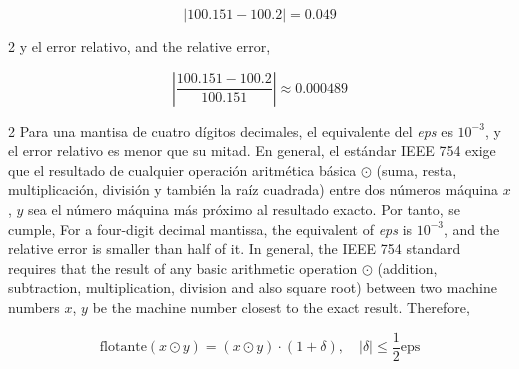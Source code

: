 \begin{equation*}
\vert 100.151-100.2 \vert=0.049
\end{equation*}
\begin{paracol}{2}
y el error relativo,
\switchcolumn
and the relative error,
\end{paracol}
\begin{equation*}
\left\vert\frac{100.151-100.2 }{100.151}\right\vert\approx 0.000489
\end{equation*}
\begin{paracol}{2}
Para una mantisa de cuatro dígitos decimales, el equivalente del \emph{eps} es $10^{-3}$, y el error relativo es menor que su mitad. En general, el estándar IEEE 754 exige que el resultado de cualquier operación aritmética básica $\odot$ (suma, resta, multiplicación, división y también la raíz cuadrada) entre dos números máquina $x$, $y$ sea el número máquina más próximo al resultado exacto. Por tanto, se cumple,
\switchcolumn
For a four-digit decimal mantissa, the equivalent of \emph{eps} is $10^{-3}$, and the relative error is smaller than half of it. In general, the IEEE 754 standard requires that the result of any basic arithmetic operation $\odot$ (addition, subtraction, multiplication, division and also square root) between two machine numbers $x$, $y$ be the machine number closest to the exact result. Therefore,
\end{paracol}
\begin{equation*}
\text{flotante}(x\odot y)=(x\odot y)\cdot(1+\delta), \quad \vert \delta \vert \leq \frac{1}{2}\text{eps}
\end{equation*}
